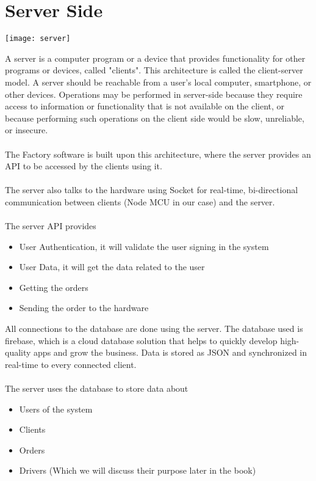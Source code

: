 \section{Server Side}

\begin{center}
    \texttt{[image: server]}
  \end{center}

  A server is a computer program or a device that provides functionality for other programs or devices,
called "clients". This architecture is called the client-server model. A server should be reachable from
a user's local computer, smartphone, or other devices. Operations may be performed in server-side
because they require access to information or functionality that is not available on the client, or
because performing such operations on the client side would be slow, unreliable, or insecure.\\\\
The Factory software is built upon this architecture, where the server provides an API to be accessed
by the clients using it.\\\\
The server also talks to the hardware using Socket for real-time, bi-directional communication
between clients (Node MCU in our case) and the server.\\\\
The server API provides
\begin{itemize}
    \item User Authentication, it will validate the user signing in the system
    \item User Data, it will get the data related to the user
    \item Getting the orders
    \item Sending the order to the hardware
\end{itemize}

All connections to the database are done using the server. The database used is firebase, which is a
cloud database solution that helps to quickly develop high-quality apps and grow the business. Data is
stored as JSON and synchronized in real-time to every connected client.\\\\
The server uses the database to store data about
\begin{itemize}
    \item Users of the system
    \item Clients
    \item Orders
    \item Drivers (Which we will discuss their purpose later in the book)
\end{itemize}

